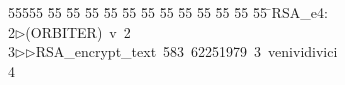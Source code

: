 %
%
\begin{tabbing}
55555 \= 55 \= 55 \= 55 \= 55 \= 55 \= 55 \= 55 \= 55 \= 55 \= 55 \= 55 \= 55 \= \>RSA\_e4:\\[0pt]
2\>$\triangleright$\>(ORBITER)\ v\ 2\ \\[0pt]
3\>$\triangleright$\>$\triangleright$\>RSA\_encrypt\_text\ 583\ 62251979\ 3\ venividivici\\[0pt]
4\>\end{tabbing}
